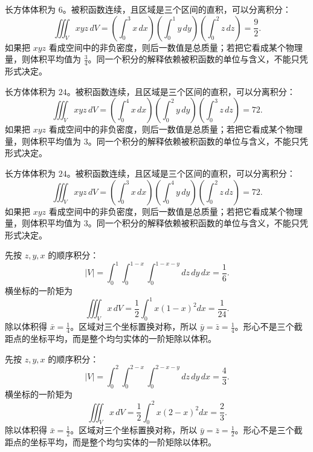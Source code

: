 \documentclass[12pt,fontset=fandol]{ctexart}
\begin{document}
\begin{solve}\label{ans:c38q4}
长方体体积为 $6$。被积函数连续，且区域是三个区间的直积，可以分离积分：
\[
\iiint_Vxyz\,dV=\left(\int_0^{3}x\,dx\right)\left(\int_0^{1}y\,dy\right)\left(\int_0^{2}z\,dz\right)=\frac{9}{2}.
\]
如果把 $xyz$ 看成空间中的非负密度，则后一数值是总质量；若把它看成某个物理量，则体积平均值为 $\frac{3}{4}$。同一个积分的解释依赖被积函数的单位与含义，不能只凭形式决定。
\end{solve}

\begin{solve}\label{ans:c38q5}
长方体体积为 $24$。被积函数连续，且区域是三个区间的直积，可以分离积分：
\[
\iiint_Vxyz\,dV=\left(\int_0^{4}x\,dx\right)\left(\int_0^{2}y\,dy\right)\left(\int_0^{3}z\,dz\right)=72.
\]
如果把 $xyz$ 看成空间中的非负密度，则后一数值是总质量；若把它看成某个物理量，则体积平均值为 $3$。同一个积分的解释依赖被积函数的单位与含义，不能只凭形式决定。
\end{solve}

\begin{solve}\label{ans:c38q6}
长方体体积为 $24$。被积函数连续，且区域是三个区间的直积，可以分离积分：
\[
\iiint_Vxyz\,dV=\left(\int_0^{3}x\,dx\right)\left(\int_0^{4}y\,dy\right)\left(\int_0^{2}z\,dz\right)=72.
\]
如果把 $xyz$ 看成空间中的非负密度，则后一数值是总质量；若把它看成某个物理量，则体积平均值为 $3$。同一个积分的解释依赖被积函数的单位与含义，不能只凭形式决定。
\end{solve}

\begin{solve}\label{ans:c38q7}
先按 $z,y,x$ 的顺序积分：
\[
|V|=\int_0^{1}\int_0^{1-x}\int_0^{1-x-y}dz\,dy\,dx=\frac{1}{6}.
\]
横坐标的一阶矩为
\[
\iiint_Vx\,dV=\frac12\int_0^{1}x(1-x)^2dx=\frac{1}{24}.
\]
除以体积得 $\bar x=\frac{1}{4}$。区域对三个坐标置换对称，所以 $\bar y=\bar z=\frac{1}{4}$。形心不是三个截距点的坐标平均，而是整个均匀实体的一阶矩除以体积。
\end{solve}

\begin{solve}\label{ans:c38q8}
先按 $z,y,x$ 的顺序积分：
\[
|V|=\int_0^{2}\int_0^{2-x}\int_0^{2-x-y}dz\,dy\,dx=\frac{4}{3}.
\]
横坐标的一阶矩为
\[
\iiint_Vx\,dV=\frac12\int_0^{2}x(2-x)^2dx=\frac{2}{3}.
\]
除以体积得 $\bar x=\frac{1}{2}$。区域对三个坐标置换对称，所以 $\bar y=\bar z=\frac{1}{2}$。形心不是三个截距点的坐标平均，而是整个均匀实体的一阶矩除以体积。
\end{solve}
\end{document}
